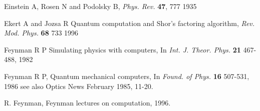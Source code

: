 \documentclass{article}
\begin{document}
\begin{thebibliography}{12}
Einstein A, Rosen N and Podolsky B,
{\em Phys. Rev.} {\bf 47}, 777 1935



Ekert A and Jozsa R 
Quantum computation and Shor's factoring algorithm,
{\em Rev. Mod. Phys.} {\bf 68} 733 1996

% 
% 
% 
% 
% 
% 


Feynman R P
Simulating physics with computers,
In {\em Int. J. Theor. Phys.} {\bf 21} 467-488, 1982

 Feynman R P,
\newblock Quantum mechanical computers,
In {\em Found. of Phys.} {\bf 16} 507-531, 1986
see also Optics News February 1985, 11-20.

R. Feynman,
\newblock Feynman lectures on computation, 1996.


% 
% 
% 
% 
% 
% 
% 


\end{thebibliography}
\end{document}
